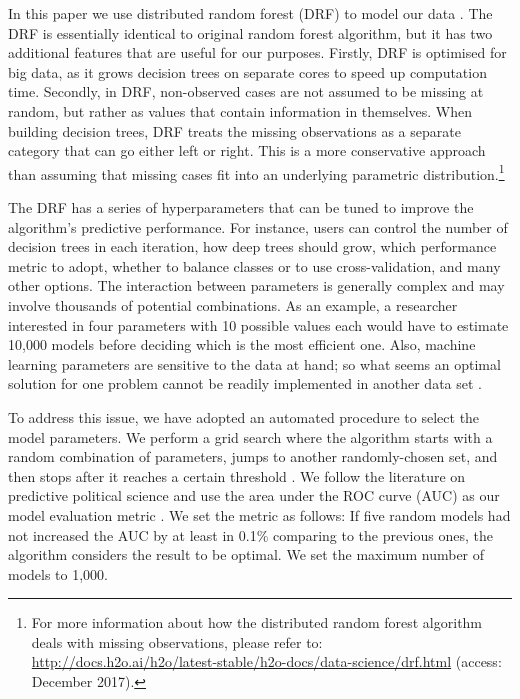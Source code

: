In this paper we use distributed random forest (DRF) to model our data \citep{h2o2017}. The DRF is essentially identical to original random forest algorithm, but it has two additional features that are useful for our purposes. Firstly, DRF is optimised for big data, as it grows decision trees on separate cores to speed up computation time. Secondly, in DRF, non-observed cases are not assumed to be missing at random, but rather as values that contain information in themselves. When building decision trees, DRF treats the missing observations as a separate category that can go either left or right. This is a more conservative approach than assuming that missing cases fit into an underlying parametric distribution.\footnote{For more information about how the distributed random forest algorithm deals with missing observations, please refer to: \href{http://docs.h2o.ai/h2o/latest-stable/h2o-docs/data-science/drf.html}{http://docs.h2o.ai/h2o/latest-stable/h2o-docs/data-science/drf.html} (access: December 2017).}

The DRF has a series of hyperparameters that can be tuned to improve the algorithm's predictive performance. For instance, users can control the number of decision trees in each iteration, how deep trees should grow, which performance metric to adopt, whether to balance classes or to use cross-validation, and many other options. The interaction between parameters is generally complex and may involve thousands of potential combinations. As an example, a researcher interested in four parameters with 10 possible values each would have to estimate 10,000 models before deciding which is the most efficient one. Also, machine learning parameters are sensitive to the data at hand; so what seems an optimal solution for one problem cannot be readily implemented in another data set \citep{genuer2008random,goldstein2010application,jones2015exploratory}.

To address this issue, we have adopted an automated procedure to select the model parameters. We perform a grid search where the algorithm starts with a random combination of parameters, jumps to another randomly-chosen set, and then stops after it reaches a certain threshold \citep[123]{cook2017h2o}. We follow the literature on predictive political science and use the area under the ROC curve (AUC) as our model evaluation metric \citep[e.g.,][]{clayton2014will,hill2014empirical,ward2010perils,ward2013learning,weidmann2010predicting}. We set the metric as follows: If five random models had not increased the AUC by at least in 0.1\% comparing to the previous ones, the algorithm considers the result to be optimal. We set the maximum number of models to 1,000.

